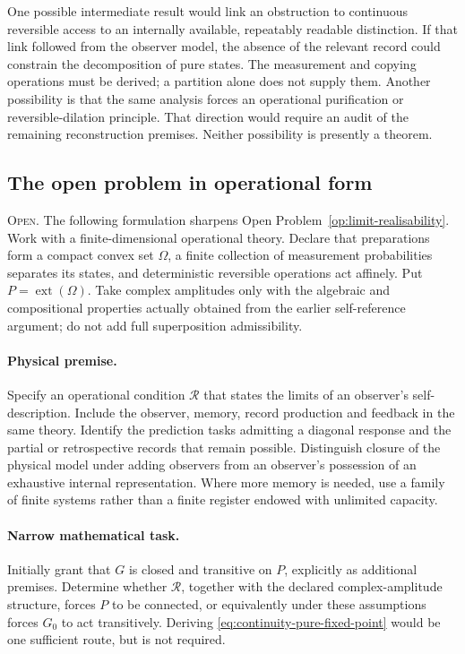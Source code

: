 One possible intermediate result would link an obstruction to continuous
reversible access to an internally available, repeatably readable distinction.
If that link followed from the observer model, the absence of the relevant
record could constrain the decomposition of pure states. The measurement
and copying operations must be derived; a partition alone does not supply
them. Another possibility is that the same analysis forces an operational
purification or reversible-dilation principle. That direction would require
an audit of the remaining reconstruction premises. Neither possibility is
presently a theorem.

\subsection{The open problem in operational form}
\label{app:continuity-open}

\noindent\textsc{Open.}
The following formulation sharpens Open Problem~\ref{op:limit-realisability}.
Work with a finite-dimensional operational theory. Declare that preparations
form a compact convex set $\Omega$, a finite collection of measurement
probabilities separates its states, and deterministic reversible operations
act affinely. Put $P=\operatorname{ext}(\Omega)$. Take complex amplitudes
only with the algebraic and compositional properties actually obtained
from the earlier self-reference argument; do not add full superposition
admissibility.

\paragraph{Physical premise.}
Specify an operational condition $\mathcal R$ that states the limits of
an observer's self-description. Include the observer, memory, record production and
feedback in the same theory. Identify the prediction tasks admitting a
diagonal response and the partial or retrospective records that remain
possible. Distinguish closure of the physical model under adding observers
from an observer's possession of an exhaustive internal representation.
Where more memory is needed, use a family of finite systems rather than a
finite register endowed with unlimited capacity.

\paragraph{Narrow mathematical task.}
Initially grant that $G$ is closed and transitive on $P$, explicitly as
additional premises. Determine whether $\mathcal R$, together with the
declared complex-amplitude structure, forces $P$ to be connected, or
equivalently under these assumptions forces $G_0$ to act transitively.
Deriving \eqref{eq:continuity-pure-fixed-point} would be one sufficient
route, but is not required.

